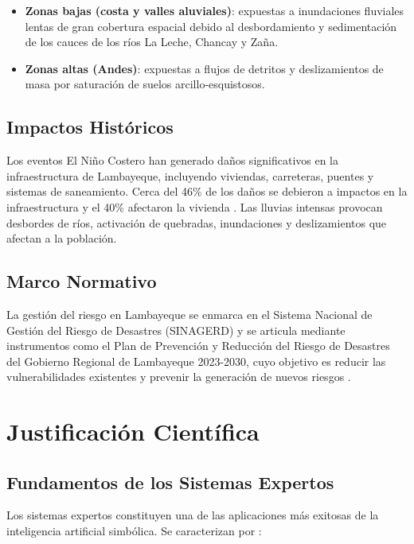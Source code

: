 \documentclass[12pt, letterpaper]{article}
\begin{document}
\begin{itemize}
  \item \textbf{Zonas bajas (costa y valles aluviales)}: expuestas a inundaciones fluviales lentas de gran cobertura espacial debido al desbordamiento y sedimentación de los cauces de los ríos La Leche, Chancay y Zaña.
  \item \textbf{Zonas altas (Andes)}: expuestas a flujos de detritos y deslizamientos de masa por saturación de suelos arcillo-esquistosos.
\end{itemize}

\subsection{Impactos Históricos}

Los eventos El Niño Costero han generado daños significativos en la infraestructura de Lambayeque, incluyendo viviendas, carreteras, puentes y sistemas de saneamiento. Cerca del 46\% de los daños se debieron a impactos en la infraestructura y el 40\% afectaron la vivienda \parencite{diaz_2018}. Las lluvias intensas provocan desbordes de ríos, activación de quebradas, inundaciones y deslizamientos que afectan a la población.

\subsection{Marco Normativo}

La gestión del riesgo en Lambayeque se enmarca en el Sistema Nacional de Gestión del Riesgo de Desastres (SINAGERD) y se articula mediante instrumentos como el Plan de Prevención y Reducción del Riesgo de Desastres del Gobierno Regional de Lambayeque 2023-2030, cuyo objetivo es reducir las vulnerabilidades existentes y prevenir la generación de nuevos riesgos \parencite{gob_regional_lambayeque_2023}.

\section{Justificación Científica}

\subsection{Fundamentos de los Sistemas Expertos}

Los sistemas expertos constituyen una de las aplicaciones más exitosas de la inteligencia artificial simbólica. Se caracterizan por \parencite{gonzalez_2000}:
\end{document}
